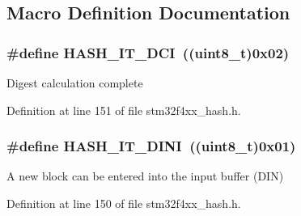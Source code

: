 \subsection{Macro Definition Documentation}
\hypertarget{group___h_a_s_h__interrupts__definition_gab5285b1618e3fac906d7502261d9bb38}{
\subsubsection[{H\-A\-S\-H\-\_\-\-I\-T\-\_\-\-D\-C\-I}]{\setlength{\rightskip}{0pt plus 5cm}\#define H\-A\-S\-H\-\_\-\-I\-T\-\_\-\-D\-C\-I~((uint8\-\_\-t)0x02)}}\label{group___h_a_s_h__interrupts__definition_gab5285b1618e3fac906d7502261d9bb38}
Digest calculation complete 

Definition at line 151 of file stm32f4xx\-\_\-hash.\-h.

\hypertarget{group___h_a_s_h__interrupts__definition_ga0df296dbab5028378cc21ad733eb5675}{
\subsubsection[{H\-A\-S\-H\-\_\-\-I\-T\-\_\-\-D\-I\-N\-I}]{\setlength{\rightskip}{0pt plus 5cm}\#define H\-A\-S\-H\-\_\-\-I\-T\-\_\-\-D\-I\-N\-I~((uint8\-\_\-t)0x01)}}\label{group___h_a_s_h__interrupts__definition_ga0df296dbab5028378cc21ad733eb5675}
A new block can be entered into the input buffer (D\-I\-N) 

Definition at line 150 of file stm32f4xx\-\_\-hash.\-h.

